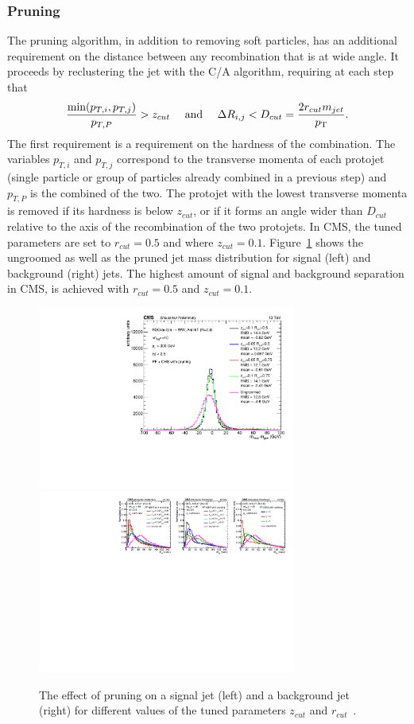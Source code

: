 \subsubsection{Pruning}
\label{sec:objreco:pruning}
The pruning algorithm, in addition to removing soft particles, has an additional requirement on the distance between any recombination that is at wide angle.
It proceeds by reclustering the jet with the C/A algorithm, requiring at each step that
\begin{equation}
  \label{eq:pruning}
\frac{ \textrm{min}(p_{T,i},p_{T,j}) }{ p_{T,P} } > z_{cut} \quad \textrm{ and } \quad \Delta R_{i,j} < D_{cut} = \frac{2 r_{cut} m_{jet}}{p_{\mathrm{T}}}.
\end{equation}
The first requirement is a requirement on the hardness of the combination. The variables $p_{T,i}$ and $p_{T,j}$ correspond to the transverse momenta of each protojet (single particle or group of particles already combined in a previous step) and $p_{T,P}$ is the combined \PT of the two. The protojet with the lowest transverse momenta is removed if its hardness is below $z_{cut}$, or if it forms an angle wider than $D_{cut}$ relative to the axis of the recombination of the two protojets. In CMS, the tuned parameters are set to $r_{cut}=0.5$ and where $z_{cut}=0.1$. Figure~\ref{fig:objreco:pruning} shows the ungroomed as well as the pruned jet mass distribution for signal (left) and background (right) jets. The highest amount of signal and background separation in CMS, is achieved with $r_{cut}=0.5$ and $z_{cut}=0.1$.
\begin{figure}[h!] 
    \centering
    \includegraphics[height=6cm]{figures/event_reconstruction/sig_pruning.pdf}
    \includegraphics[height=6cm]{figures/event_reconstruction/bkg_pruning-noData.pdf}
    \caption{The effect of pruning on a signal jet (left) and a background jet (right) for different values of the tuned parameters $z_{cut}$ and $r_{cut}$~\cite{CMS-PAS-JME-14-001}.}
    \label{fig:objreco:pruning}
\end{figure}
\clearpage
